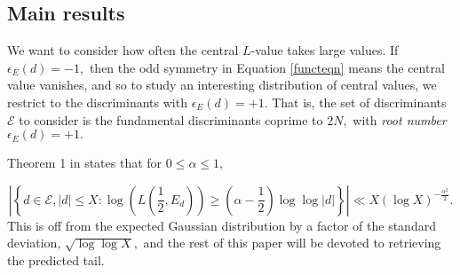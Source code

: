 \documentclass[12pt]{amsart}
\numberwithin{equation}{section}
\numberwithin{thm}{section}
\newcommand{\1}{\mathbf 1}
\begin{document}
\subsection{Main results} We want to consider how often the central $L$-value takes large values.
If $\epsilon_E(d)=-1,$ then the odd symmetry in Equation \eqref{functeqn} means the central value vanishes, and so to study an interesting distribution of central values, we restrict to the discriminants with $\epsilon_E(d)=+1.$
That is, the set of discriminants $\mathcal{E}$ to consider is the fundamental discriminants coprime to $2N,$ with \textit{root number} $\epsilon_E(d)=+1.$ 

Theorem 1 in \cite{RS2} states that for $0\le \alpha\le 1,$

\begin{equation}\label{olddev}
	\left|\left\{d\in \mathcal{E}, |d|\le X: \log\left(L\left(\frac{1}{2}, E_d\right)\right)\ge \left(\alpha-\frac{1}{2}\right)\log\log|d|\right\}\right|\ll X(\log X)^{-\frac{\alpha^2}{2}}.
\end{equation}
This is off from the expected Gaussian distribution by a factor of the standard deviation, $\sqrt{\log\log X},$ and the rest of this paper will be devoted to retrieving the predicted tail.
\end{document}
